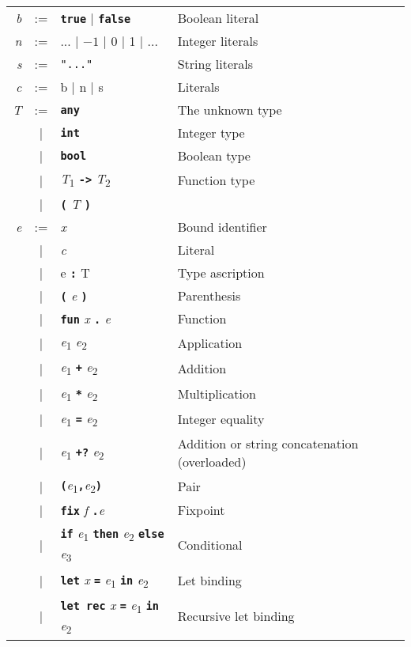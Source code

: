 \documentclass{book}
\newcommand{\kw}[1]{\textbf{\texttt{#1}}}
\newcommand{\metavar}[1]{\textit{#1}}
\begin{document}
\begin{tabular}{rcll}
\metavar{b} & := & \kw{true} | \kw{false} & Boolean literal \\
\metavar{n} & := & ... | $-1$ | 0 | 1 | ... & Integer literals \\
\metavar{s} & := & \texttt{"..."} & String literals \\
\metavar{c} & := & b | n | s & Literals \\
\metavar{T} & := & \kw{any} & The unknown type \\
            & |  & \kw{int} & Integer type \\
            & |  & \kw{bool} & Boolean type \\
            & |  & \metavar{T}\textsubscript{1} \kw{->} \metavar{T}\textsubscript{2} & Function type \\
            & |  & \kw{(} \metavar{T} \kw{)} \\
\metavar{e} & := & \textit{x}  & Bound identifier \\
            & |  & \metavar{c} & Literal \\
            & |  & e \kw{:} T  & Type ascription \\
            & |  & \kw{(} \metavar{e} \kw{)} & Parenthesis \\
            & |  & \kw{fun} \metavar{x} \kw{.} \metavar{e} & Function \\
            & |  & \metavar{e}\textsubscript{1} \metavar{e}\textsubscript{2}
                 & Application \\
            & |  & \metavar{e}\textsubscript{1} \kw{+} \metavar{e}\textsubscript{2}
                 & Addition \\
            & |  & \metavar{e}\textsubscript{1} \kw{*} \metavar{e}\textsubscript{2}
                 & Multiplication \\
            & |  & \metavar{e}\textsubscript{1} \kw{=} \metavar{e}\textsubscript{2}
                 & Integer equality \\
            & |  & \metavar{e}\textsubscript{1} \kw{+?} \metavar{e}\textsubscript{2}
                 & Addition or string concatenation (overloaded) \\
            & |  & \kw{(}\metavar{e}\textsubscript{1}\kw{,}\metavar{e}\textsubscript{2}\kw{)}
                 & Pair \\
            & |  & \kw{fix} \metavar{f} \kw{.}\metavar{e}
                 & Fixpoint \\
            & |  & \kw{if} \metavar{e}\textsubscript{1} \kw{then} \metavar{e}\textsubscript{2} \kw{else} \metavar{e}\textsubscript{3}
                 & Conditional \\
            & |  & \kw{let} \metavar{x} \kw{=} \metavar{e}\textsubscript{1} \kw{in} \metavar{e}\textsubscript{2}
                 & Let binding \\
            & |  & \kw{let rec} \metavar{x} \kw{=} \metavar{e}\textsubscript{1} \kw{in} \metavar{e}\textsubscript{2}
                 & Recursive let binding \\

\end{tabular}
\end{document}
